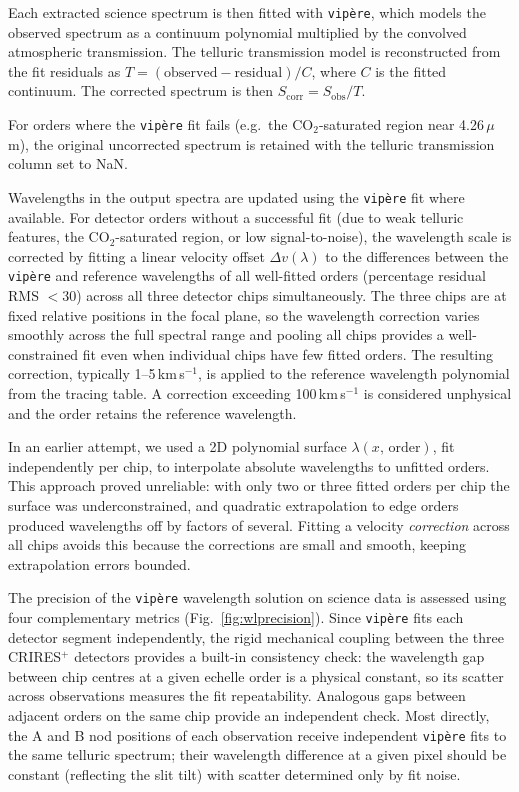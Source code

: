 \documentclass{aa}
\newcommand{\crires}{CRIRES$^+$}
\newcommand{\um}{$\mu$m}
\newcommand{\kms}{km\,s$^{-1}$}
\newcommand{\vipere}{\texttt{vip\`ere}}
\begin{document}
Each extracted science spectrum is then fitted with \vipere{}, which models
the observed spectrum as a continuum polynomial multiplied by the
convolved atmospheric transmission.  The telluric transmission model is
reconstructed from the fit residuals as
$T = (\mathrm{observed} - \mathrm{residual}) / C$, where $C$ is the
fitted continuum. The corrected spectrum is then
$S_\mathrm{corr} = S_\mathrm{obs} / T$.

For orders where the \vipere{} fit fails (e.g.\ the CO$_2$-saturated
region near 4.26\,\um), the original uncorrected spectrum is retained
with the telluric transmission column set to NaN.

Wavelengths in the output spectra are updated using the \vipere{} fit
where available. For detector orders without a successful fit (due to weak
telluric features, the CO$_2$-saturated region, or low signal-to-noise),
the wavelength scale is corrected by fitting a linear velocity offset
$\Delta v(\lambda)$ to the differences between the \vipere{} and
reference wavelengths of all well-fitted orders (percentage residual RMS
$< 30$) across all three detector chips simultaneously. The three chips
are at fixed relative positions in the focal plane, so the wavelength
correction varies smoothly across the full spectral range and pooling all
chips provides a well-constrained fit even when individual chips have few
fitted orders. The resulting correction, typically 1--5\,\kms{}, is
applied to the reference wavelength polynomial from the tracing table.
A correction exceeding 100\,\kms{} is considered unphysical and the
order retains the reference wavelength.

In an earlier attempt, we used a 2D polynomial surface $\lambda(x,\,
\mathrm{order})$, fit independently per chip, to interpolate absolute
wavelengths to unfitted orders. This approach proved unreliable:
with only two or three fitted orders per chip the surface was
underconstrained, and quadratic extrapolation to edge orders produced
wavelengths off by factors of several. Fitting a velocity \emph{correction}
across all chips avoids this because the corrections are small and smooth,
keeping extrapolation errors bounded.

The precision of the \vipere{} wavelength solution on science data is
assessed using four complementary metrics (Fig.~\ref{fig:wlprecision}).
Since \vipere{} fits each detector segment independently, the rigid
mechanical coupling between the three \crires{} detectors provides a
built-in consistency check: the wavelength gap between chip centres at a
given echelle order is a physical constant, so its scatter across
observations measures the fit repeatability. Analogous gaps between
adjacent orders on the same chip provide an independent check. Most
directly, the A and B nod positions of each observation receive
independent \vipere{} fits to the same telluric spectrum; their
wavelength difference at a given pixel should be constant (reflecting the
slit tilt) with scatter determined only by fit noise.
\end{document}
